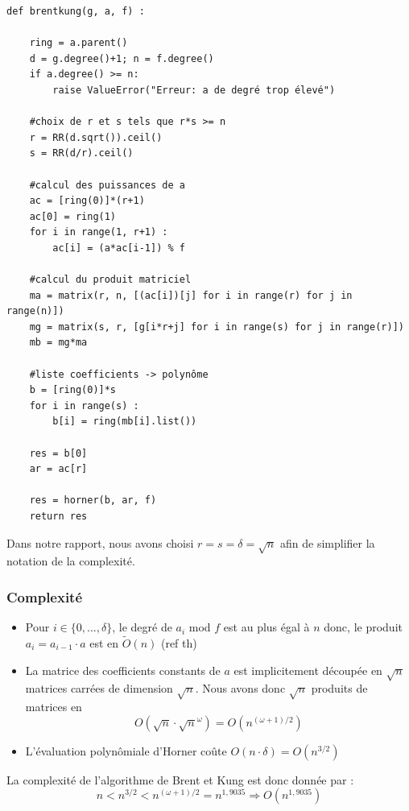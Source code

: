 \documentclass[a4paper]{article}
\begin{document}
\begin{lstlisting}[title={brent and kung}]
def brentkung(g, a, f) :

	ring = a.parent()
	d = g.degree()+1; n = f.degree()
	if a.degree() >= n:
		raise ValueError("Erreur: a de degré trop élevé")

    #choix de r et s tels que r*s >= n
	r = RR(d.sqrt()).ceil()
	s = RR(d/r).ceil()

    #calcul des puissances de a
	ac = [ring(0)]*(r+1)
	ac[0] = ring(1)
	for i in range(1, r+1) :
		ac[i] = (a*ac[i-1]) % f

    #calcul du produit matriciel
	ma = matrix(r, n, [(ac[i])[j] for i in range(r) for j in range(n)])
	mg = matrix(s, r, [g[i*r+j] for i in range(s) for j in range(r)])
	mb = mg*ma

    #liste coefficients -> polynôme
	b = [ring(0)]*s
	for i in range(s) :
		b[i] = ring(mb[i].list())

	res = b[0]
	ar = ac[r]

	res = horner(b, ar, f)
	return res
\end{lstlisting}

Dans notre rapport, nous avons choisi $ r = s = \delta = \sqrt{n}$ afin de simplifier la notation de la complexité.

\subsubsection*{Complexité}
\begin{itemize}
    \item Pour $i \in \{0,...,\delta\}$, le degré de $a_i$ mod $f$ est au plus égal à $n$ donc, le produit $a_i=a_{i-1}\cdot a$ est en $\tilde{O}(n)$ (ref th)
    \item La matrice des coefficients constants de $a$ est implicitement découpée en $\sqrt{n}$ matrices carrées de dimension $\sqrt{n}$.
    Nous avons donc $\sqrt{n}$ produits de matrices en $$O(\sqrt{n}\cdot \sqrt{n}^{\omega})=O(n^{(\omega+1)/2})$$ 
    \item L'évaluation polynômiale d'Horner coûte $O(n\cdot \delta)=O(n^{3/2})$
\end{itemize}
La complexité de l'algorithme de Brent et Kung est donc donnée par :
\[
n < n^{3/2} < n^{(\omega+1)/2}= n^{1,9035} \Longrightarrow O(n^{1,9035})
\]

\newpage
\end{document}
